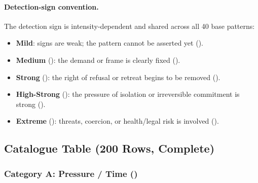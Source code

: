 \paragraph{Detection-sign convention.}
The detection sign is intensity-dependent and shared across all 40
base patterns:

\begin{itemize}
\item \textbf{Mild}: signs are weak; the pattern cannot be
asserted yet ().
\item \textbf{Medium} (): the demand or frame is clearly fixed
().
\item \textbf{Strong} (): the right of refusal or retreat begins to
be removed ().
\item \textbf{High-Strong} (): the pressure of isolation or
irreversible commitment is strong ().
\item \textbf{Extreme} (): threats, coercion, or
health/legal risk is involved ().
\end{itemize}

\subsection{Catalogue Table (200 Rows, Complete)}
\label{sec:ttm-catalog-table}

\subsubsection*{Category A: Pressure / Time ()}


